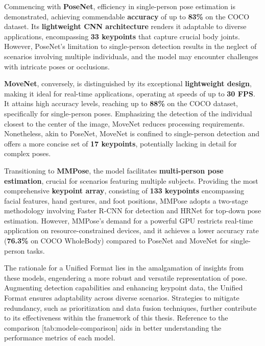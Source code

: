 Commencing with {\bf PoseNet}, efficiency in single-person pose estimation is demonstrated, achieving commendable {\bf accuracy} of up to {\bf 83\%} on the COCO dataset. Its {\bf lightweight CNN architecture} renders it adaptable to diverse applications, encompassing {\bf 33 keypoints} that capture crucial body joints. However, PoseNet's limitation to single-person detection results in the neglect of scenarios involving multiple individuals, and the model may encounter challenges with intricate poses or occlusions.

{\bf MoveNet}, conversely, is distinguished by its exceptional {\bf lightweight design}, making it ideal for real-time applications, operating at speeds of up to {\bf 30 FPS}. It attains high accuracy levels, reaching up to {\bf 88\%} on the COCO dataset, specifically for single-person poses. Emphasizing the detection of the individual closest to the center of the image, MoveNet reduces processing requirements. Nonetheless, akin to PoseNet, MoveNet is confined to single-person detection and offers a more concise set of {\bf 17 keypoints}, potentially lacking in detail for complex poses.

Transitioning to {\bf MMPose}, the model facilitates {\bf multi-person pose estimation}, crucial for scenarios featuring multiple subjects. Providing the most comprehensive {\bf keypoint array}, consisting of {\bf 133 keypoints} encompassing facial features, hand gestures, and foot positions, MMPose adopts a two-stage methodology involving Faster R-CNN for detection and HRNet for top-down pose estimation. However, MMPose's demand for a powerful GPU restricts real-time application on resource-constrained devices, and it achieves a lower accuracy rate ({\bf 76.3\%} on COCO WholeBody) compared to PoseNet and MoveNet for single-person tasks.

The rationale for a Unified Format lies in the amalgamation of insights from these models, engendering a more robust and versatile representation of pose. Augmenting detection capabilities and enhancing keypoint data, the Unified Format ensures adaptability across diverse scenarios. Strategies to mitigate redundancy, such as prioritization and data fusion techniques, further contribute to its effectiveness within the framework of this thesis. Reference to the comparison [tab:models-comparison] aids in better understanding the performance metrics of each model.

